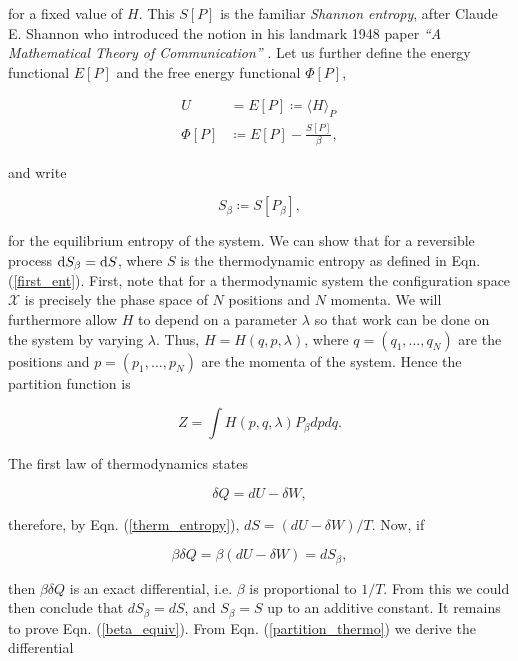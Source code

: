for a fixed value of $H$. This $S[P]$ is the familiar \textit{Shannon entropy}, after Claude E. Shannon who introduced the notion in his landmark 1948 paper \textit{``A Mathematical Theory of Communication''} \cite{ShannonCommunication}. Let us further define the energy functional $E[P]$ and the free energy functional $\Phi[P]$,

\begin{align}
  U &= E[P] \coloneqq \langle H \rangle_P \\
  \Phi[P] &\coloneqq E[P] - \frac{S[P]}{\beta},
\end{align}

and write

\begin{equation}
  S_\beta \coloneqq S[P_\beta],
\end{equation}

for the equilibrium entropy of the system. We can show that for a reversible process $\mathrm{d} S_\beta = \mathrm{d} S$, where $S$ is the thermodynamic entropy as defined in Eqn. (\ref{first_ent}). First, note that for a thermodynamic system the configuration space $\mathcal{X}$ is precisely the phase space of $N$ positions and $N$ momenta. We will furthermore allow $H$ to depend on a parameter $\lambda$ so that work can be done on the system by varying $\lambda$. Thus, $H = H(q,p,\lambda)$, where $ q = (q_1, \ldots, q_N)$ are the positions and $p = (p_1, \ldots, p_N)$ are the momenta of the system. Hence the partition function is

\begin{equation}\label{partition_thermo}
  Z = \int H(p,q,\lambda)P_\beta dpdq.
\end{equation}

The first law of thermodynamics states

\begin{equation}
  \delta Q =  dU - \delta W,
\end{equation}

therefore, by Eqn. (\ref{therm_entropy}), $dS =  (dU - \delta W)/T$. Now, if

\begin{equation}\label{beta_equiv}
  \beta \delta Q = \beta ( dU - \delta W) = dS_\beta,
\end{equation}

then $\beta \delta Q$ is an exact differential, i.e. $\beta$ is proportional to $1/T$. From this we could then conclude that $dS_\beta = dS$, and $S_\beta = S$ up to an additive constant. It remains to prove Eqn. (\ref{beta_equiv}). From Eqn. (\ref{partition_thermo}) we derive the differential

